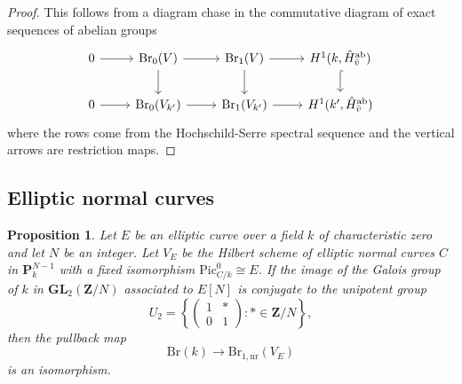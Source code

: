 \documentclass[10pt,letterpaper,twoside]{article}
\renewcommand{\1}{\mathbf{1}}
\newcommand{\bP}{\mathbf{P}}
\newcommand{\bZ}{\mathbf{Z}}
\newcommand{\nr}{\mathrm{nr}}
\newcommand{\GL}{\mathbf{GL}}
\newcommand{\Pic}{\mathrm{Pic}}
\newcommand{\Br}{\mathrm{Br}}
\newcommand{\iso}{\cong}
\theoremstyle{plain}
\newtheorem{proposition}[theorem]{Proposition}
\theoremstyle{plain}
\theoremstyle{definition}
\theoremstyle{named}
\theoremstyle{definition}
\begin{document}
	\begin{proof}
		This follows from a diagram chase in the commutative diagram of exact sequences of abelian groups
		\[
		\begin{tikzcd}
			0\arrow[r] &  \Br_0(V) \arrow[r] \arrow[d] & \Br_1(V) \arrow[r] \arrow[d] & H^1(k,\hat{H}^{\mathrm{ab}}_{\Bar{v}})\arrow[d,hook] \\
			0\arrow[r] &  \Br_0(V_{k'}) \arrow[r] & \Br_1(V_{k'}) \arrow[r] & H^1(k',\hat{H}^{\mathrm{ab}}_{\Bar{v}})
		\end{tikzcd}
		\]
		where the rows come from the Hochschild-Serre spectral sequence and the vertical arrows are restriction maps. 
	\end{proof}
	
	




	\subsection{Elliptic normal curves}
	
	
	
	\begin{proposition}
		Let $E$ be an elliptic curve over a field $k$ of characteristic zero and let $N$ be an integer. Let $V_E$ be the
		Hilbert scheme of elliptic normal curves $C$ in $\bP^{N-1}_k$
		with a fixed isomorphism $\Pic_{C/k}^0\iso E$. 
		If the image of the Galois group of $k$ in $\GL_2(\bZ/N)$ associated to $E[N]$
		is conjugate to the unipotent group $$U_2=\left\{\begin{pmatrix}1&*\\0&1\end{pmatrix}\colon
		*\in\bZ/N\right\},$$ then the pullback map $$\Br(k)\rightarrow\Br_{1,\nr}(V_E)$$
		is an isomorphism.
	\end{proposition}
	
\end{document}
